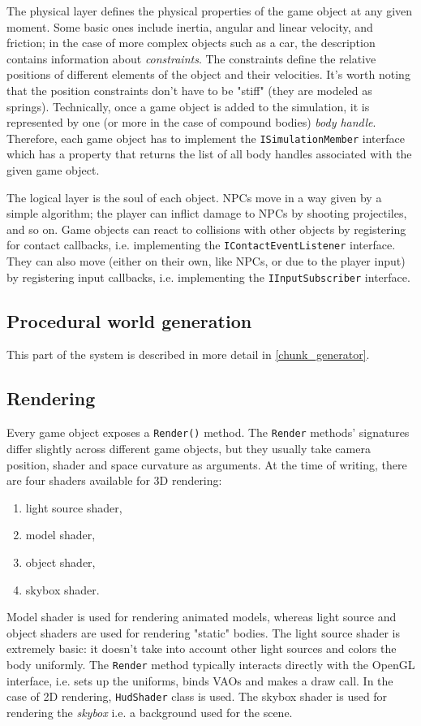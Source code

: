 The physical layer defines the physical properties of the game object at any given moment.
Some basic ones include inertia, angular and linear velocity, and friction;
in the case of more complex objects such as a car, the description contains information about \textit{constraints}.
The constraints define the relative positions of different elements of the object and their velocities.
It's worth noting that the position constraints don't have to be "stiff" (they are modeled as springs).
Technically, once a game object is added to the simulation, it is represented by one (or more in the case of compound bodies) \textit{body handle}.
Therefore, each game object has to implement the \texttt{ISimulationMember} interface which has a property that returns the list of all body handles associated with the given game object.

The logical layer is the soul of each object.
NPCs move in a way given by a simple algorithm;
the player can inflict damage to NPCs by shooting projectiles, and so on.
Game objects can react to collisions with other objects by registering for contact callbacks, i.e. implementing the \texttt{IContactEventListener} interface.
They can also move (either on their own, like NPCs, or due to the player input) by registering input callbacks, i.e. implementing the \texttt{IInputSubscriber} interface.

\subsection{Procedural world generation}
This part of the system is described in more detail in \ref{chunk_generator}.

\subsection{Rendering}
Every game object exposes a \texttt{Render()} method.
The \texttt{Render} methods' signatures differ slightly across different game objects, but they usually take camera position, shader and space curvature as arguments.
At the time of writing, there are four shaders available for 3D rendering:
\begin{enumerate}
    \item light source shader,
    \item model shader,
    \item object shader,
    \item skybox shader.
\end{enumerate}
Model shader is used for rendering animated models, whereas light source and object shaders are used for rendering "static" bodies.
The light source shader is extremely basic: it doesn't take into account other light sources and colors the body uniformly.
The \texttt{Render} method typically interacts directly with the OpenGL interface, i.e. sets up the uniforms, binds VAOs and makes a draw call.
In the case of 2D rendering, \texttt{HudShader} class is used.
The skybox shader is used for rendering the \textit{skybox} i.e. a background used for the scene.

